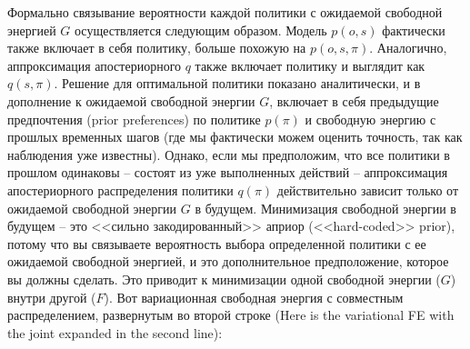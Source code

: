 \documentclass[twoside,leqno, 11pt]{article}
\begin{document}
	
	Формально связывание вероятности каждой политики с ожидаемой свободной энергией $G$ осуществляется следующим образом. Модель $p(o,s)$ фактически также включает в себя политику, больше похожую на $p(o,s,\pi)$. Аналогично, аппроксимация апостериорного $q$ также включает политику и выглядит как $q(s,\pi)$. Решение для оптимальной политики показано аналитически, и в дополнение к ожидаемой свободной энергии $G$, включает в себя предыдущие предпочтения (prior preferences) по политике $p(\pi)$ и свободную энергию с прошлых временных шагов (где мы фактически можем оценить точность, так как наблюдения уже известны). Однако, если мы предположим, что все политики в прошлом одинаковы -- состоят из уже выполненных действий -- аппроксимация апостериорного распределения политики $q(\pi)$ действительно зависит только от ожидаемой свободной энергии $G$ в будущем. Минимизация свободной энергии в будущем -- это <<сильно закодированный>> априор (<<hard-coded>> prior), потому что вы связываете вероятность выбора определенной политики с ее ожидаемой свободной энергией, и это дополнительное предположение, которое вы должны сделать. Это приводит к минимизации одной свободной энергии ($G$) внутри другой ($F$). Вот вариационная свободная энергия с совместным распределением, развернутым во второй строке (Here is the variational FE with the joint expanded in the second line):
	
	
\end{document}
